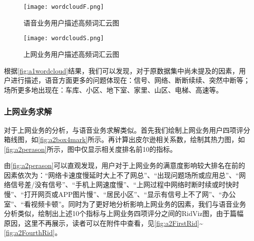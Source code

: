 \documentclass{MathorCupmodeling}
\begin{document}
	\begin{figure}[h!t]
		\centering
		\begin{minipage}{0.48\linewidth}
			\centering
			\texttt{[image: wordcloudF.png]}
			\caption{语音业务用户描述高频词汇云图}
			\label{fig:a1wordcloud}
		\end{minipage}
		\begin{minipage}{0.48\linewidth}
			\centering
			\texttt{[image: wordcloudS.png]}
			\caption{上网业务用户描述高频词汇云图}
			\label{fig:a2wordcloud}
		\end{minipage}
	\end{figure}


	根据\textcolor{blue}{\cref{fig:a1wordcloud}}结果，我们可以发现，对于原数据集中尚未提及的因素，用户进行描述，语音方面更多的问题体现在：信号、网络、断断续续、突然中断等；场所更多地出现在：车库、小区、地下室、家里、山区、电梯、高速等。

	\subsubsection{上网业务求解}
	对于上网业务的分析，与语音业务求解类似。首先我们绘制上网业务用户四项评分箱线图，如\textcolor{blue}{\cref{fig:a2box4mark}}所示。再计算出皮尔逊相关系数，绘制其热力图，如\textcolor{blue}{\cref{fig:a2perason}}所示，图中仅显示相关度排名前10的指标。

	由\textcolor{blue}{\cref{fig:a2perason}}可以直观发现，用户对于上网业务的满意度影响较大排名在前的因素依次为：“网络卡速度慢延时大上不了网总”、“出现问题场所或应用总”、“网络信号差/没有信号”、“手机上网速度慢”、“上网过程中网络时断时续或时快时慢”、“打开网页或APP图片慢”、“居民小区”、“显示有信号上不了网”、“办公室”、“看视频卡顿”。同时为了更好地分析影响上网业务的因素，我们与语音业务分析类似，绘制出上述10个指标与上网业务四项评分之间的RidViz图，由于篇幅原因，这里不再展示，读者可以在附件中查看，见\textcolor{blue}{\cref{fig:a2FirstRid}}\textasciitilde\textcolor{blue}{\cref{fig:a2FourthRid}}。
\end{document}

